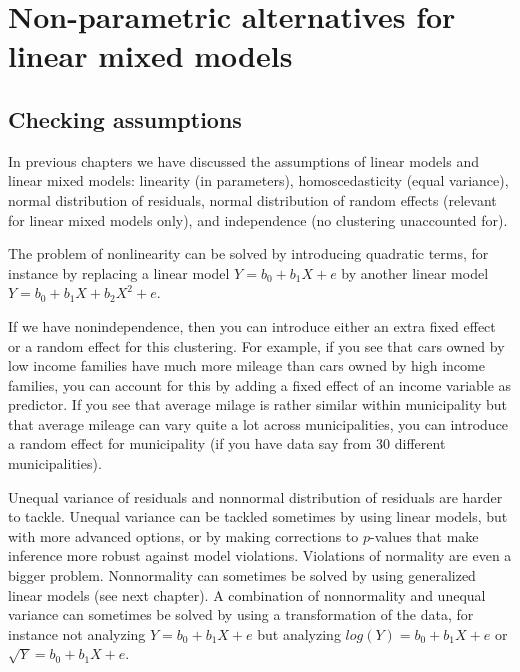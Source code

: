 \documentclass[]{report}\usepackage[]{graphicx}\usepackage[]{color}
\begin{document}

\chapter{Non-parametric alternatives for linear mixed models}\label{chap:nonpar2}


\section{Checking assumptions}

In previous chapters we have discussed the assumptions of linear models and linear mixed models: linearity (in parameters), homoscedasticity (equal variance), normal distribution of residuals, normal distribution of random effects (relevant for linear mixed models only), and independence (no clustering unaccounted for). 




The problem of nonlinearity can be solved by introducing quadratic terms, for instance by replacing a linear model $Y = b_0 + b_1 X + e$ by another linear model $Y = b_0 + b_1 X + b_2 X^2 + e$.

If we have nonindependence, then you can introduce either an extra fixed effect or a random effect for this clustering. For example, if you see that cars owned by low income families have much more mileage than cars owned by high income families, you can account for this by adding a fixed effect of an income variable as predictor. If you see that average milage is rather similar within municipality but that average mileage can vary quite a lot across municipalities, you can introduce a random effect for municipality (if you have data say from 30 different municipalities). 

Unequal variance of residuals and nonnormal distribution of residuals are harder to tackle. Unequal variance can be tackled sometimes by using linear models, but with more advanced options, or by making corrections to $p$-values that make inference more robust against model violations. Violations of normality are even a bigger problem. Nonnormality can sometimes be solved by using generalized linear models (see next chapter). A combination of nonnormality and unequal variance can sometimes be solved by using a transformation of the data, for instance not analyzing $Y = b_0 + b_1 X + e$ but analyzing $log(Y)=  b_0 + b_1 X + e$ or $\sqrt{Y}=  b_0 + b_1 X + e$.
\end{document}
